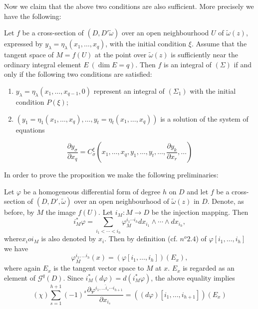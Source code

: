   Now we claim that the above two conditions are also sufficient. More
  precisely we have the following: 
\begin{proposition}\label{chap2:sec2.9:prop16}%
  Let $f$ be a cross-section of $(D, D' \tilde{\omega})$ over an open
  neighbourhood $U$ of $\tilde{\omega}(z)$, expressed by $y_\lambda =
  \eta_\lambda (x_1, \ldots , x_q)$, with the initial condition
  $\xi$. Assume that the tangent space of $M=f(U)$ at the point over
  $\tilde{\omega}(z)$ is sufficiently near the ordinary integral
  element $E ~( \dim E = q)$. Then $f$ is an integral of $( \Sigma)$ if
  and only if the  following two conditions are satisfied: 
  \begin{enumerate}[\rm(i)]
  \item $y_\lambda = \eta_\lambda (x_1, \ldots  , x_{q-1}, 0)$
    represent an integral  of $(\Sigma_1)$ with the initial condition
    $P (\xi)$; 
  \item $(y_1= \eta_1 (x_1, \ldots , x_q) , \ldots , y_t= \eta_t( x_1
    , \ldots, x_q))$ is a solution of the system of equations 
  \end{enumerate}
  \begin{equation}
    \frac{\partial y_\sigma}{\partial x_q}= C^{\xi}_\sigma  \left(x_1,
    \ldots , x_q, y_1 , \ldots , y_t , \ldots , \frac{\partial
      y_k}{\partial x_r}, \dots \right)  \tag{**} 
  \end{equation}
\end{proposition}

In order to prove the proposition we make the following preliminaries:

Let $\varphi$ be a homogeneous differential form of degree  $h$ on $D$
and let $f$ be a cross-section of $(D, D' , \tilde{\omega})$ over an
open neighbourhood of $\tilde{\omega}(z)$ in $D$. Denote, as before,
by $M$ the image $f(U)$. Let $i_M: M \to D$ be the injection
mapping. Then  
$$
i^*_M \varphi = \sum_{i_1 < \cdots < i_h} \varphi _M^{i_1 \cdots i_h}
dx_{i_1} \wedge \cdots \wedge dx_{i_h}, 
$$ 
where\pageoriginale $x_i o i_M$ is also denoted by $x_i$. Then by definition
(cf. $n^o 2.4$) of $\varphi [i_1 , \ldots , i_h]$ we have  
$$
\varphi^{i_1, \ldots i_h}_M (x) = ( \varphi [i_1 , \ldots , i_h])
(E_x), 
$$
where again $E_x$ is the tangent vector space to $M$ at $x$. $E_x$ is
regarded as an element of $\mathscr{G}^q(D)$. Since $i_M^* (d \varphi
) =  d(i_M^* \varphi)$, the above equality implies 
$$
(\chi)  \sum_{s=1}^{h+1} (-1)^s \frac{\partial \varphi^{i_1 , \ldots
    \hat{i}_s \cdots i_{h+1}}}{\partial x_{i_s}} = (( d \varphi ) [i_1
  , \ldots , i_{h+1}]) (E_x)  
$$

